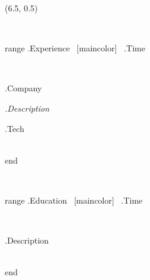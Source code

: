 \begin{textblock}{14.5}(6.5, 0.5)
\newlength\indentLength
\pgfmathsetlength{\indentLength}{5mm}
\newlength\outsidePageLength
\pgfmathsetlength{\outsidePageLength}{140mm}
\newlength\insidePageLength
\pgfmathsetlength{\insidePageLength}{135mm}


\begin{minipage}{\indentLength}
~
\end{minipage}
\begin{minipage}{\outsidePageLength}
    {{range .Experience}}
        {} ~\xrfill[0.0ex]{0.5pt}[maincolor]~ {{.Time}}

        \smallskip

        \begin{minipage}{\indentLength}
        ~
        \end{minipage}
        \begin{minipage}{\insidePageLength}
            {{.Company}}

            \smallskip

           {\itshape {{.Description}}}

            \smallskip

            {{.Tech}}
        \end{minipage} \\[2ex]
    {{end}}
\end{minipage}

\bigskip



\begin{minipage}{\indentLength}
~
\end{minipage}
\begin{minipage}{\outsidePageLength}
    {{range .Education}}
        {} ~\xrfill[0.0ex]{0.5pt}[maincolor]~ {{.Time}}

        \smallskip

        \begin{minipage}{\indentLength}
        ~
        \end{minipage}
        \begin{minipage}{\insidePageLength}
           {{.Description}}

        \end{minipage} \\[2ex]
    {{end}}
\end{minipage}

\end{textblock}
